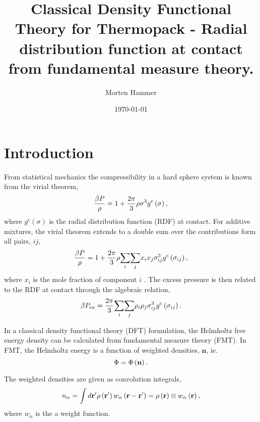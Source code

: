 \documentclass[12pt, letterpaper]{article}
\title{Classical Density Functional Theory for Thermopack - Radial distribution function at contact from fundamental measure theory.}
\author{Morten Hammer}
\date{\today}
\newcommand*{\lb}{\ensuremath{\left(}}
\newcommand*{\rb}{\ensuremath{\right)}}
\newcommand{\excess}{\ensuremath{\text{ex}}\xspace}
\newcommand{\contact}{\ensuremath{\text{c}}\xspace}
\begin{document}


\begin{titlepage}
\maketitle
\end{titlepage}

\section{Introduction}

From statistical mechanics the compressibility in a hard sphere
system is known from the virial theorem,
\begin{equation}
  \label{eq:compressibillity}
  \frac{\beta P}{\rho} = 1 + \frac{2 \pi}{3} \rho \sigma^3 g^{\contact}\lb\sigma\rb,
\end{equation}
where $g^{\contact}(\sigma)$ is the radial distribution function (RDF)
at contact. For additive mixtures, the virial theorem extends to a
double sum over the contributions form all pairs, $ij$,
\begin{equation}
  \label{eq:compressibillity_mix}
  \frac{\beta P}{\rho} = 1 + \frac{2 \pi}{3} \rho \underset{i}{\sum} \underset{j}{\sum} x_i x_j \sigma_{ij}^3 g^{\contact}\lb \sigma_{ij} \rb,
\end{equation}
where $x_i$ is the mole fraction of component $i$
\cite[Eq. 5.14]{mulero2008}. The excess pressure is then related to the RDF
at contact through the algebraic relation,
\begin{equation}
  \label{eq:excess_pressure_mix}
  \beta P_\excess = \frac{2 \pi}{3} \underset{i}{\sum} \underset{j}{\sum} \rho_i \rho_j \sigma_{ij}^3 g^{\contact}\lb \sigma_{ij} \rb.
\end{equation}

In a classical density functional theory (DFT) formulation, the
Helmholtz free energy density can be calculated from fundamental
measure theory (FMT). In FMT, the Helmholtz energy is a function of
weighted densities, $\mathbf{n}$, ie.
\begin{equation}
  \label{eq:fmt_helmholtz}
  \Phi = \Phi \lb \mathbf{n} \rb.
\end{equation}

The weighted densities are given as convolution integrals,
\begin{equation}
  \label{eq:n_alpha}
  n_\alpha = \int d \mathbf{r}^\prime \rho \lb \mathbf{r}^\prime \rb w_\alpha \lb \mathbf{r} - \mathbf{r}^\prime \rb =  \rho \lb \mathbf{r} \rb \otimes w_\alpha \lb \mathbf{r}\rb,
\end{equation}
where $w_\alpha$ is the a weight function.
\end{document}
